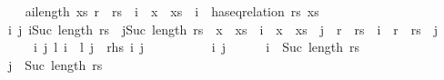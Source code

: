 \begin{isabellebody}
\isamarkupfalse%
\isanewline
\ \ \isamarkupfalse%
\ a{\isacharcolon}{\kern0pt}{\isachardoublequoteopen}{\isacharparenleft}{\kern0pt}{\isasymforall}i{\isacharless}{\kern0pt}length\ xs{\isachardot}{\kern0pt}\ {\isacharparenleft}{\kern0pt}r\ {\isacharequal}{\kern0pt}\ rs\ {\isacharbang}{\kern0pt}\ i{\isacharparenright}{\kern0pt}\ {\isacharequal}{\kern0pt}\ {\isacharparenleft}{\kern0pt}x\ {\isacharequal}{\kern0pt}\ xs\ {\isacharbang}{\kern0pt}\ i{\isacharparenright}{\kern0pt}{\isacharparenright}{\kern0pt}\ {\isasymand}\ has{\isacharunderscore}{\kern0pt}eq{\isacharunderscore}{\kern0pt}relation\ rs\ xs{\isachardoublequoteclose}\isanewline
\ \ \isamarkupfalse%
\ {\isachardoublequoteopen}{\isasymAnd}i\ j{\isachardot}{\kern0pt}\ i{\isacharless}{\kern0pt}Suc\ {\isacharparenleft}{\kern0pt}length\ rs{\isacharparenright}{\kern0pt}\ {\isasymLongrightarrow}\ j{\isacharless}{\kern0pt}Suc\ {\isacharparenleft}{\kern0pt}length\ rs{\isacharparenright}{\kern0pt}\ {\isasymLongrightarrow}\ {\isacharparenleft}{\kern0pt}{\isacharparenleft}{\kern0pt}x\ {\isacharhash}{\kern0pt}\ xs{\isacharparenright}{\kern0pt}\ {\isacharbang}{\kern0pt}\ i\ {\isacharequal}{\kern0pt}\ {\isacharparenleft}{\kern0pt}x\ {\isacharhash}{\kern0pt}\ xs{\isacharparenright}{\kern0pt}\ {\isacharbang}{\kern0pt}\ j{\isacharparenright}{\kern0pt}\ {\isacharequal}{\kern0pt}\ {\isacharparenleft}{\kern0pt}{\isacharparenleft}{\kern0pt}r\ {\isacharhash}{\kern0pt}\ rs{\isacharparenright}{\kern0pt}\ {\isacharbang}{\kern0pt}\ i\ {\isacharequal}{\kern0pt}\ {\isacharparenleft}{\kern0pt}r\ {\isacharhash}{\kern0pt}\ rs{\isacharparenright}{\kern0pt}\ {\isacharbang}{\kern0pt}\ j{\isacharparenright}{\kern0pt}{\isachardoublequoteclose}\isanewline
\ \ \ \ {\isacharparenleft}{\kern0pt}\ {\isachardoublequoteopen}{\isasymAnd}i\ j{\isachardot}{\kern0pt}\ {\isacharquery}{\kern0pt}l{}\ i\ {\isasymLongrightarrow}\ {\isacharquery}{\kern0pt}l{}\ j\ {\isasymLongrightarrow}\ {\isacharquery}{\kern0pt}rhs\ i\ j{\isachardoublequoteclose}{\isacharparenright}{\kern0pt}\isanewline
\ \ \isamarkupfalse%
\ {\isacharminus}{\kern0pt}\isanewline
\ \ \ \ \isamarkupfalse%
\ i\ j\isanewline
\ \ \ \ \isamarkupfalse%
\ {\isachardoublequoteopen}i\ {\isacharless}{\kern0pt}\ Suc\ {\isacharparenleft}{\kern0pt}length\ rs{\isacharparenright}{\kern0pt}{\isachardoublequoteclose}\isanewline
\ \ \ \ \isamarkupfalse%
\ \isamarkupfalse%
\ {\isachardoublequoteopen}j\ {\isacharless}{\kern0pt}\ Suc\ {\isacharparenleft}{\kern0pt}length\ rs{\isacharparenright}{\kern0pt}{\isachardoublequoteclose}\ \isanewline

\end{isabellebody}
